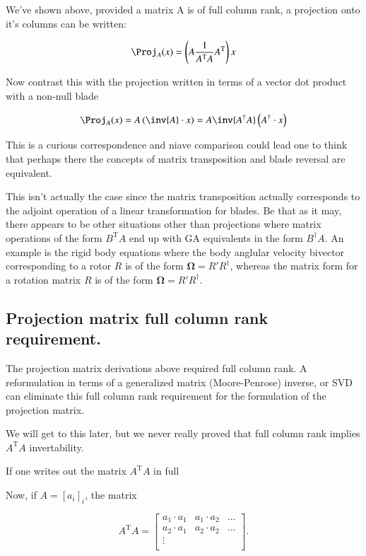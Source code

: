 \documentclass{article}      %
\newcommand{\T}[0]{{\text{T}}}
\newcommand{\BOmega}[0]{\boldsymbol{\Omega}}
\begin{document}
We've shown above, provided a matrix A is of full column rank, a projection onto it's columns can be written:

\[
\Proj_A(x) = \left( A \frac{1}{A^\T A} A^\T \right) x
\]

Now contrast this with the projection written in terms of a vector dot product with a non-null blade 

\[
\Proj_A(x) = A \left(\inv{A} \cdot x\right) = A \inv{A^\dagger A} \left(A^\dagger \cdot x\right)
\]

This is a curious correspondence and niave comparison could lead one to think that perhaps there the concepts of matrix
transposition and blade reversal are equivalent.

This isn't actually the case since the matrix transposition actually corresponds to
the adjoint operation of a linear transformation for blades.  Be that as it may, there appears to be other situations
other than projections where matrix operations of the form $B^\T A$ end up with GA equivalents in the form $B^\dagger A$.  An example
is the rigid body equations where the body anglular velocity bivector corresponding to a rotor $R$ is of the form $\BOmega = R' R^\dagger$, whereas the matrix
form for a rotation matrix $R$ is of the form $\BOmega = R' R^\dagger$.

\subsection{ Projection matrix full column rank requirement. }

The projection matrix derivations above required full column rank.  A reformulation in terms
of a generalized matrix (Moore-Penrose) inverse, or SVD can eliminate this full column rank requirement for
the formulation of the projection matrix.

We will get to this later, but we never really proved that
full column rank implies $A^\T A$ invertability.

If one writes out the matrix $A^\T A$ in full

Now, if $A = [a_i]_i$, the matrix

\begin{equation}\label{eqn:AtA}
A^\T A
=
\begin{bmatrix}
{a_1} \cdot {a_1} & {a_1} \cdot {a_2} & \hdots \\
{a_2} \cdot {a_1} & {a_2} \cdot {a_2} & \hdots \\
\vdots & & \\
\end{bmatrix}.
\end{equation}
\end{document}
